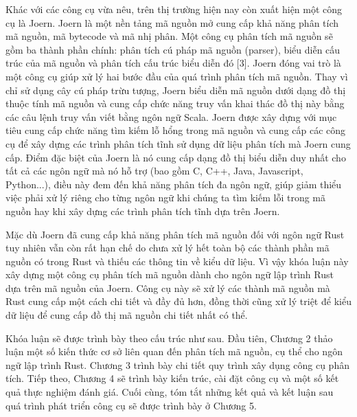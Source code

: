 Khác với các công cụ vừa nêu, trên thị trường hiện nay còn xuất hiện một công cụ là Joern.
Joern là một nền tảng mã nguồn mở cung cấp khả năng phân tích mã nguồn, mã bytecode và mã nhị phân.
Một công cụ phân tích mã nguồn sẽ gồm ba thành phần chính: phân tích cú pháp mã nguồn (parser), biểu diễn cấu trúc của mã nguồn và phân tích cấu trúc biểu diễn đó [3].
Joern đóng vai trò là một công cụ giúp xử lý hai bước đầu của quá trình phân tích mã nguồn.
Thay vì chỉ sử dụng cây cú pháp trừu tượng, Joern biểu diễn mã nguồn dưới dạng đồ thị thuộc tính mã nguồn và cung cấp chức năng truy vấn khai thác đồ thị này bằng các câu lệnh truy vấn viết bằng ngôn ngữ Scala.
Joern được xây dựng với mục tiêu cung cấp chức năng tìm kiếm lỗ hổng trong mã nguồn và cung cấp các công cụ để xây dựng các trình phân tích tĩnh sử dụng dữ liệu phân tích mà Joern cung cấp.
Điểm đặc biệt của Joern là nó cung cấp dạng đồ thị biểu diễn duy nhất cho tất cả các ngôn ngữ mà nó hỗ trợ (bao gồm C, C++, Java, Javascript, Python...), điều này đem đến khả năng phân tích đa ngôn ngữ, giúp giảm thiểu việc phải xử lý riêng cho từng ngôn ngữ khi chúng ta tìm kiếm lỗi trong mã nguồn hay khi xây dựng các trình phân tích tĩnh dựa trên Joern.

Mặc dù Joern đã cung cấp khả năng phân tích mã nguồn đối với ngôn ngữ Rust tuy nhiên vẫn còn rất hạn chế do chưa xử lý hết toàn bộ các thành phần mã nguồn có trong Rust và thiếu các thông tin về kiểu dữ liệu.
Vì vậy khóa luận này xây dựng một công cụ phân tích mã nguồn dành cho ngôn ngữ lập trình Rust dựa trên mã nguồn của Joern.
Công cụ này sẽ xử lý các thành mã nguồn mà Rust cung cấp một cách chi tiết và đầy đủ hơn, đồng thời cũng xử lý triệt để kiểu dữ liệu để cung cấp đồ thị mã nguồn chi tiết nhất có thể.

Khóa luận sẽ được trình bày theo cấu trúc như sau.
Đầu tiên, Chương 2 thảo luận một số kiến thức cơ sở liên quan đến phân tích mã nguồn, cụ thể cho ngôn ngữ lập trình Rust.
Chương 3 trình bày chi tiết quy trình xây dụng công cụ phân tích.
Tiếp theo, Chương 4 sẽ trình bày kiến trúc, cài đặt công cụ và một số kết quả thực nghiệm đánh giá.
Cuối cùng, tóm tắt những kết quả và kết luận sau quá trình phát triển công cụ sẽ được trình bày ở Chương 5.
